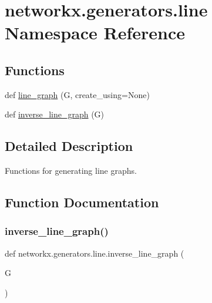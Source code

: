 \hypertarget{namespacenetworkx_1_1generators_1_1line}{}\section{networkx.\+generators.\+line Namespace Reference}
\label{namespacenetworkx_1_1generators_1_1line}
\subsection*{Functions}
\begin{DoxyCompactItemize}
\item 
def \hyperlink{namespacenetworkx_1_1generators_1_1line_a91e386e1b725708aec705908b53d81ca}{line\+\_\+graph} (G, create\+\_\+using=None)
\item 
def \hyperlink{namespacenetworkx_1_1generators_1_1line_aa2ea922a9a8351b3868ca866bd316262}{inverse\+\_\+line\+\_\+graph} (G)
\end{DoxyCompactItemize}


\subsection{Detailed Description}
\begin{DoxyVerb}Functions for generating line graphs.\end{DoxyVerb}
 

\subsection{Function Documentation}
\mbox{\label{namespacenetworkx_1_1generators_1_1line_aa2ea922a9a8351b3868ca866bd316262}} 
\subsubsection{\texorpdfstring{inverse\+\_\+line\+\_\+graph()}{inverse\_line\_graph()}}
{\footnotesize\ttfamily def networkx.\+generators.\+line.\+inverse\+\_\+line\+\_\+graph (\begin{DoxyParamCaption}\item[{}]{G }\end{DoxyParamCaption})}


